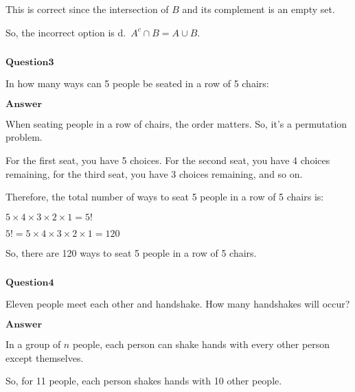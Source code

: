 \documentclass[11pt]{article}
\makeatletter
\newcommand{\boxspacing}{\kern\kvtcb@left@rule\kern\kvtcb@boxsep}
\newcommand{\prompt}[4]{
        {\ttfamily\llap{{\color{#2}[#3]:\hspace{3pt}#4}}\vspace{-\baselineskip}}
    }
\makeatother
\begin{document}
This is correct since the intersection of $B$ and its complement is an
empty set.

So, the incorrect option is d.~$A^c \cap B=A \cup B$.

    \begin{tcolorbox}[breakable, size=fbox, boxrule=1pt, pad at break*=1mm,colback=cellbackground, colframe=cellborder]
\prompt{In}{incolor}{ }{\boxspacing}
\begin{Verbatim}[commandchars=\\\{\}]

\end{Verbatim}
\end{tcolorbox}

    $\textbf{Question3}$

In how many ways can 5 people be seated in a row of 5 chairs:

$\textbf{Answer}$

    When seating people in a row of chairs, the order matters. So, it's a
permutation problem.

For the first seat, you have 5 choices. For the second seat, you have 4
choices remaining, for the third seat, you have 3 choices remaining, and
so on.

Therefore, the total number of ways to seat 5 people in a row of 5
chairs is:

$5 \times 4 \times 3 \times 2 \times 1 = 5!$

$5! = 5 \times 4 \times 3 \times 2 \times 1 = 120$

So, there are 120 ways to seat 5 people in a row of 5 chairs.

    \begin{tcolorbox}[breakable, size=fbox, boxrule=1pt, pad at break*=1mm,colback=cellbackground, colframe=cellborder]
\prompt{In}{incolor}{ }{\boxspacing}
\begin{Verbatim}[commandchars=\\\{\}]

\end{Verbatim}
\end{tcolorbox}

    $\textbf{Question4}$

Eleven people meet each other and handshake. How many handshakes will
occur?

$\textbf{Answer}$

    In a group of $ n $ people, each person can shake hands with every
other person except themselves.

So, for 11 people, each person shakes hands with 10 other people.
\end{document}
